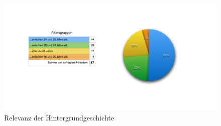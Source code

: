 \begin{description}
\begin{figure}[H]
    \centering
    \includegraphics[trim=40 75 30 70,clip,width=1.2\textwidth, page=6]{files/statistik/umfrage1Ergebnisse.pdf}
    \caption{Relevanz der Hintergrundgeschichte}
    \label{chart:story}
\end{figure}


%
%
%
%


\end{description}
